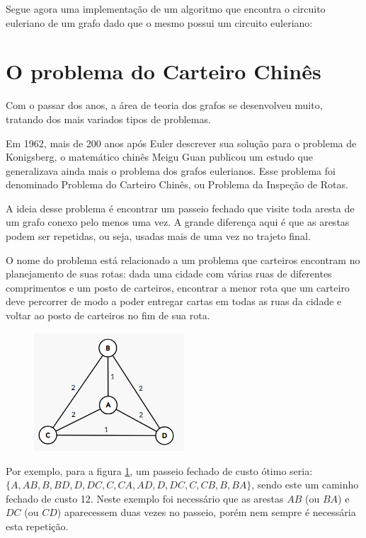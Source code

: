 \documentclass{article}
\begin{document}
Segue agora uma implementação de um algoritmo que encontra o circuito euleriano de um grafo dado que o mesmo possui um circuito euleriano:

 



\section{O problema do Carteiro Chinês}

Com o passar dos anos, a área de teoria dos grafos se desenvolveu muito, tratando dos mais variados tipos de problemas.

Em 1962, mais de 200 anos após Euler descrever sua solução para o problema de Konigsberg, o matemático chinês Meigu Guan publicou um estudo que generalizava ainda mais o problema dos grafos eulerianos. 
Esse problema foi denominado Problema do Carteiro Chinês, ou Problema da Inspeção de Rotas.

A ideia desse problema é encontrar um passeio fechado que visite toda aresta de um grafo conexo pelo menos uma vez. 
A grande diferença aqui é que as arestas podem ser repetidas, ou seja, usadas mais de uma vez no trajeto final.

O nome do problema está relacionado a um problema que carteiros encontram no planejamento de suas rotas: dada uma cidade com várias ruas de diferentes comprimentos e um posto de carteiros, encontrar a menor rota que um carteiro deve percorrer de modo a poder entregar cartas em todas as ruas da cidade e voltar ao posto de carteiros no fim de sua rota.

\begin{figure} 
    \centering
    \includegraphics[width=0.5\textwidth]{graph.png}
	\label{graph}
\end{figure}

Por exemplo, para a figura \ref{graph}, um passeio fechado de custo ótimo seria: $\{A, AB, B, BD, D, DC, C, CA, AD, D, DC, C, CB, B, BA\}$, sendo este um caminho fechado de custo 12.
Neste exemplo foi necessário que as arestas $AB$ (ou $BA$) e $DC$ (ou $CD$) aparecessem duas vezes no passeio, porém nem sempre é necessária esta repetição.
\end{document}
